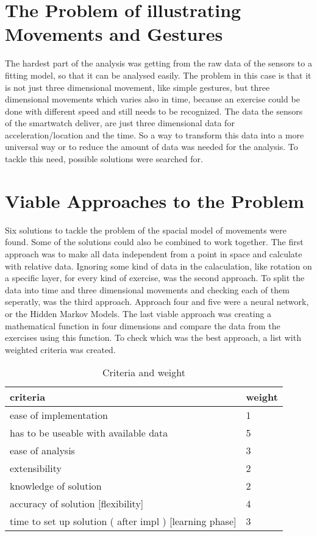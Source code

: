 
\section{The Problem of illustrating Movements and Gestures}

The hardest part of the analysis was getting from the raw data of the sensors to a fitting model, so that it can be analysed easily. The problem in this case is that it is not just three 	dimensional movement, like simple gestures, but three dimensional movements which varies also in time, because an exercise could be done with different speed and still needs to be recognized. The data the sensors of the smartwatch deliver, are just three dimensional data for acceleration/location and the time. So a way to transform this data into a more universal way or to reduce the amount of data was needed for the analysis. To tackle this need, possible solutions were searched for.

\section{Viable Approaches to the Problem}

Six solutions to tackle the problem of the spacial model of movements were found. Some of the solutions could also be combined to work together. The first approach was to make all data independent from a point in space and calculate with relative data. Ignoring some kind of data in the calaculation, like rotation on a specific layer, for every kind of exercise, was the second approach. To split the data into time and three dimensional movements and checking each of them seperatly, was the third approach. Approach four and five were a neural network, or the Hidden Markov Models. The last viable approach was creating a mathematical function in four dimensions and compare the data from the exercises using this function.
\newline
\newline
To check which was the best approach, a list with weighted criteria was created.

\begin{table}[h]
\begin{tabular}{|l|l|}
\hline
	\textbf{criteria} & \textbf{weight} \\
\hline
	ease of implementation & 1\\
\hline
	has to be useable with available data & 5\\
\hline
	ease of analysis & 3\\
\hline
	extensibility & 2\\
\hline
	knowledge of solution & 2\\
\hline
	accuracy of solution [flexibility] & 4\\
\hline
	time to set up solution ( after impl )
[learning phase] & 3\\
\hline

\end{tabular}
\caption{ Criteria and weight  }
\end{table}

